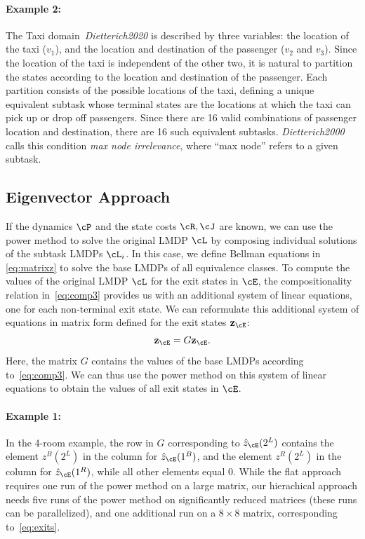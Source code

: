 \paragraph{Example 2:} The Taxi domain~\textit{Dietterich2020} is described by three variables: the location of the taxi ($v_1$), and the location and destination of the passenger ($v_2$ and $v_3$). Since the location of the taxi is independent of the other two, it is natural to partition the states according to the location and destination of the passenger. Each partition consists of the possible locations of the taxi, defining a unique equivalent subtask whose terminal states are the locations at which the taxi can pick up or drop off passengers. Since there are 16 valid combinations of passenger location and destination, there are 16 such equivalent subtasks.
\textit{Dietterich2000} calls this condition {\em max node irrelevance}, where ``max node'' refers to a given subtask.

\subsection{Eigenvector Approach}

If the dynamics $\cP$ and the state costs $\cR, \cJ$ are known, we can use the power method to solve the original LMDP $\cL$ by composing individual solutions of the subtask LMDPs $\cL_i$.
In this case, we define Bellman equations in \eqref{eq:matrixz} to solve the base LMDPs of all equivalence classes.
To compute the values of the original LMDP $\cL$ for the exit states in $\cE$, the compositionality relation in~\eqref{eq:comp3} provides us with an additional system of linear equations, one for each non-terminal exit state. We can reformulate this additional system of equations in matrix form defined for the exit states ${\bf z}_\cE$:
\begin{equation}\label{eq:exits}
{\bf z}_\cE=G{\bf z}_\cE.
\end{equation}
Here, the matrix $G$ contains the values of the base LMDPs according to~\eqref{eq:comp3}.
We can thus use the power method on this system of linear equations to obtain the values of all exit states in $\cE$.

\paragraph{Example 1:} In the 4-room example, the row in $G$ corresponding to $\hat{z}_\cE(2^L)$ contains the element $z^B(2^L)$ in the column for $\hat{z}_\cE(1^B)$, and the element $z^R(2^L)$ in the column for $\hat{z}_\cE(1^R)$, while all other elements equal $0$. While the flat approach requires one run of the power method on a large matrix, %
our hierachical approach needs five runs of the power method on significantly reduced %
 matrices (these runs can be parallelized), and one additional run on a $8\times 8$ matrix, corresponding to~\eqref{eq:exits}.\\ %

